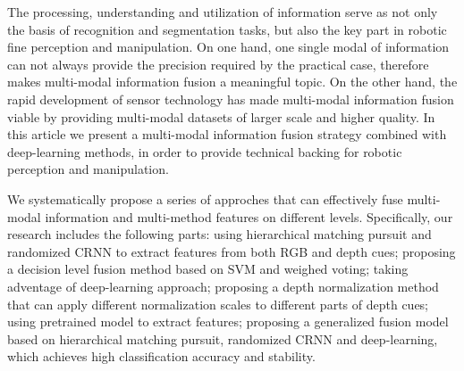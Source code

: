 
\begin{eabstract}
  The processing, understanding and utilization of information serve as not only the basis of recognition and segmentation tasks, but also the key part in robotic fine perception and manipulation. On one hand, one single modal of information can not always provide the precision required by the practical case, therefore makes multi-modal information fusion a meaningful topic. On the other hand, the rapid development of sensor technology has made multi-modal information fusion viable by providing multi-modal datasets of larger scale and higher quality. In this article we present a multi-modal information fusion strategy combined with deep-learning methods, in order to provide technical backing for robotic perception and manipulation.
  
  We systematically propose a series of approches that can effectively fuse multi-modal information and multi-method features on different levels. Specifically, our research includes the following parts: using hierarchical matching pursuit and randomized CRNN to extract features from both RGB and depth cues; proposing a decision level fusion method based on SVM and weighed voting; taking adventage of deep-learning approach; proposing a depth normalization method that can apply different normalization scales to different parts of depth cues; using pretrained model to extract features; proposing a generalized fusion model based on hierarchical matching pursuit, randomized CRNN and deep-learning, which achieves high classification accuracy and stability.
\end{eabstract}


